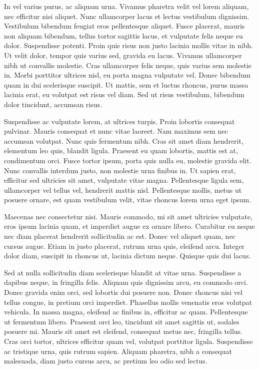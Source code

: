 \documentclass{article}
\begin{document}
In vel varius purus, ac aliquam urna. Vivamus pharetra velit vel lorem aliquam, nec efficitur nisi aliquet. Nunc ullamcorper lacus et lectus vestibulum dignissim. Vestibulum bibendum feugiat eros pellentesque aliquet. Fusce placerat, mauris non aliquam bibendum, tellus tortor sagittis lacus, et vulputate felis neque eu dolor. Suspendisse potenti. Proin quis risus non justo lacinia mollis vitae in nibh. Ut velit dolor, tempor quis varius sed, gravida eu lacus. Vivamus ullamcorper nibh ut convallis molestie. Cras ullamcorper felis neque, quis varius sem molestie in. Morbi porttitor ultrices nisl, eu porta magna vulputate vel. Donec bibendum quam in dui scelerisque suscipit. Ut mattis, sem et luctus rhoncus, purus massa lacinia erat, eu volutpat est risus vel diam. Sed ut risus vestibulum, bibendum dolor tincidunt, accumsan risus.

Suspendisse ac vulputate lorem, at ultrices turpis. Proin lobortis consequat pulvinar. Mauris consequat et nunc vitae laoreet. Nam maximus sem nec accumsan volutpat. Nunc quis fermentum nibh. Cras sit amet diam hendrerit, elementum leo quis, blandit ligula. Praesent eu quam lobortis, mattis est at, condimentum orci. Fusce tortor ipsum, porta quis nulla eu, molestie gravida elit. Nunc convallis interdum justo, non molestie urna finibus in. Ut sapien erat, efficitur sed ultricies sit amet, vulputate vitae magna. Pellentesque ligula sem, ullamcorper vel tellus vel, hendrerit mattis nisl. Pellentesque mollis, metus ut posuere ornare, est quam vestibulum velit, vitae rhoncus lorem urna eget ipsum.

Maecenas nec consectetur nisi. Mauris commodo, mi sit amet ultricies vulputate, eros ipsum lacinia quam, et imperdiet augue ex ornare libero. Curabitur eu neque nec diam placerat hendrerit sollicitudin ac est. Donec vel aliquet quam, nec cursus augue. Etiam in justo placerat, rutrum urna quis, eleifend arcu. Integer dolor diam, suscipit in rhoncus ut, lacinia dictum neque. Quisque quis dui lacus.

Sed at nulla sollicitudin diam scelerisque blandit at vitae urna. Suspendisse a dapibus neque, in fringilla felis. Aliquam quis dignissim arcu, eu commodo orci. Donec gravida enim orci, sed lobortis dui posuere non. Donec rhoncus nisi vel tellus congue, in pretium orci imperdiet. Phasellus mollis venenatis eros volutpat vehicula. In massa magna, eleifend ac finibus in, efficitur ac quam. Pellentesque ut fermentum libero. Praesent orci leo, tincidunt sit amet sagittis ut, sodales posuere mi. Mauris sit amet est eleifend, consequat metus nec, fringilla tellus. Cras orci tortor, ultrices efficitur quam vel, volutpat porttitor ligula. Suspendisse ac tristique urna, quis rutrum sapien. Aliquam pharetra, nibh a consequat malesuada, diam justo cursus arcu, ac pretium leo odio sed lectus.
\end{document}
